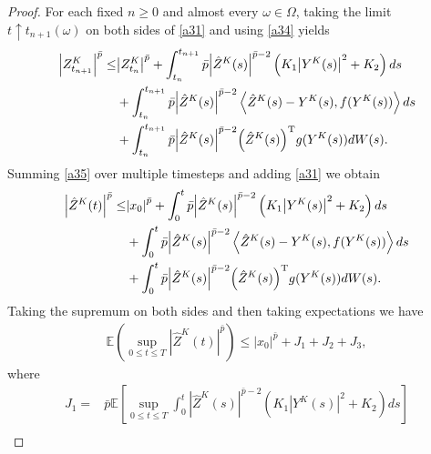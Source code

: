 \documentclass[preprint,12pt,compress]{elsarticle}
\begin{document}
\begin{proof}
For each fixed $n \ge 0$ and almost every $\omega \in \Omega$, taking the limit ${t \uparrow {t_{n+1} (\omega)}}$ on both sides of \eqref{a31} and using \eqref{a34} yields
\begin{equation}  \label{a35}
	\begin{split}
		{\left| {Z_{{t_{n + 1}}}^K} \right|^{\bar p}} \le& {\left| {Z_{{t_{n}}}^K} \right|^{\bar p}} + \int_{{t_{n}}}^{{t_{n+1}}} {\bar p} {\left| {{{\hat Z}^K}(s)} \right|^{\bar p - 2}}\left( {{K_1}{{\left| {{Y^K}(s)} \right|}^2} + {K_2}} \right)ds \\
		&+ \int_{{t_{n}}}^{{t_{n+1}}} {\bar p{{\left| {{{\hat Z}^K}(s)} \right|}^{\bar p - 2}}\left\langle {{{\hat Z}^K}(s) - {Y^K}(s),f({Y^K}(s))} \right\rangle ds} \\
		&+ \int_{{t_{n}}}^{{t_{n+1}}} {\bar p{{\left| {{{\hat Z}^K}(s)} \right|}^{\bar p - 2}}{{\left( {{{\hat Z}^K}(s)} \right)}^{\rm T}}g({Y^K}(s))dW(s)} .
	\end{split}
\end{equation}
Summing \eqref{a35} over multiple timesteps and adding \eqref{a31} we obtain
\begin{equation*}
\begin{split}
	{\left| {{{\hat Z}^K}(t)} \right|^{\bar p}} \le& {\left| {{x_0}} \right|^{\bar p}} + \int_0^t {\bar p} {\left| {{{\hat Z}^K}(s)} \right|^{\bar p - 2}}\left( {{K_1}{{\left| {{Y^K}(s)} \right|}^2} + {K_2}} \right)ds \\
	&+ \int_0^t {\bar p{{\left| {{{\hat Z}^K}(s)} \right|}^{\bar p - 2}}\left\langle {{{\hat Z}^K}(s) - {Y^K}(s),f({Y^K}(s))} \right\rangle ds}  \\
	&+ \int_{{0}}^t {\bar p{{\left| {{{\hat Z}^K}(s)} \right|}^{\bar p - 2}}{{\left( {{{\hat Z}^K}(s)} \right)}^{\rm T}}g({Y^K}(s))dW(s)}. 
\end{split}
\end{equation*}
Taking the supremum on both sides and then taking expectations we have
\begin{equation}  \label{Jsum}
	\begin{split}
		\mathbb{E}\left( {\mathop {\sup }\limits_{0 \le t \le T} {{\left| {{{\hat{Z}}^K}(t)} \right|}^{\bar p}}} \right) \le {\left| {{x_0}} \right|^{\bar p}} + {J_1} + {J_2} + {J_3},
	\end{split}
\end{equation}
where 
\begin{equation*}
	\begin{split}
		{J_1} =& \bar p\mathbb{E}\left[ {\mathop {\sup }\limits_{0 \le t \le T} \int_0^{{t}} {{{\left| {{{\hat Z}^K}(s)} \right|}^{\bar p - 2}}\left( {{K_1}{{\left| {{Y^K}(s)} \right|}^2} + {K_2}} \right)ds} } \right] \\

\end{split}
\end{equation*}
\end{proof}
\end{document}
